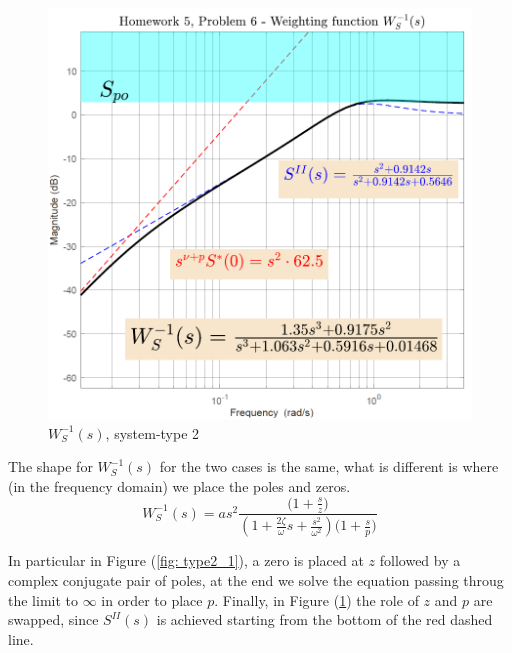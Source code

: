\documentclass[a4paper, 12pt]{article}
\begin{document}
    \begin{figure}[h]\label{fig: type2_2}
        \centering
        \includegraphics[scale=0.8]{img/Ws_type2_2.png}
        \caption{$W_S^{-1}(s)$, system-type 2}
    \end{figure}
    The shape for $W_S^{-1}(s)$ for the two cases is the same, what is different is where (in the frequency domain) we place the poles and zeros.
    {\large{
        \begin{equation}
            W_S^{-1}(s) = a{s^{2}} \frac{
                \bigl(1+\frac{s}{z}\bigr)
            }
            {
                {(1+\frac{2\zeta}{\omega}s+\frac{s^2}{\omega^2})}
                {\bigl(1+\frac{s}{p}\bigr)}
            }
        \end{equation}
    }}

    In particular in Figure (\ref{fig: type2_1}), a zero is placed at $z$ followed by a complex conjugate pair of poles, at the end we solve the equation passing throug the limit to $\infty$ in order to place $p$. 
    Finally, in Figure (\ref{fig: type2_2}) the role of $z$ and $p$ are swapped, since $S^{II}(s)$ is achieved starting from the bottom of the red dashed line.
    
\end{document}
